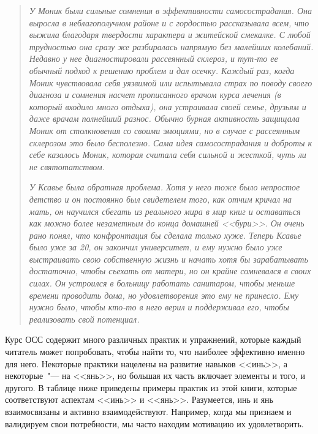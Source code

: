 \begin{quotation}
	\textit{
		У Моник были сильные сомнения в эффективности самосострадания. Она выросла в неблагополучном районе и с гордостью рассказывала всем, что выжила благодаря твердости характера и житейской смекалке. С любой трудностью она сразу же разбиралась напрямую без малейших колебаний. Недавно у нее диагностировали рассеянный склероз, и тут-то ее обычный подход к решению проблем и дал осечку.  Каждый раз, когда Моник чувствовала себя уязвимой или испытывала страх по поводу своего диагноза и сомнения насчет прописанного врачом курса лечения (в который входило много отдыха), она устраивала своей семье, друзьям и даже врачам полнейший разнос. Обычно бурная активность защищала Моник от столкновения со своими эмоциями, но в случае с рассеянным склерозом это было бесполезно. Сама идея самосострадания и доброты к себе казалось Моник, которая считала себя сильной и жесткой, чуть ли не святотатством.
	}  
	
	\textit{
		У Ксавье была обратная проблема. Хотя у него тоже было непростое детство и он постоянно был свидетелем того, как отчим кричал на мать, он научился сбегать из реального мира в мир книг и оставаться как можно более незаметным до конца домашней <<бури>>. Он очень рано понял, что конфронтация бы сделала только хуже. Теперь Ксавье было уже за 20, он закончил университет, и ему нужно было уже выстраивать свою собственную жизнь и начать хотя бы зарабатывать достаточно, чтобы съехать от матери, но он крайне сомневался в своих силах. Он устроился в больницу работать санитаром, чтобы меньше времени проводить дома, но удовлетворения это ему не принесло. Ему нужно было, чтобы кто-то в него верил и поддерживал его, чтобы реализовать свой потенциал.
	} 
\end{quotation}

Курс ОСС содержит много различных практик и упражнений, которые каждый читатель может попробовать, чтобы найти то, что наиболее эффективно именно для него. Некоторые практики нацелены на развитие навыков <<инь>>, а некоторые~"--- на <<янь>>, но большая их часть включает элементы и того, и другого. В таблице ниже приведены примеры практик из этой книги, которые соответствуют аспектам <<инь>> и <<янь>>. Разумеется, инь и янь взаимосвязаны и активно взаимодействуют. Например, когда мы признаем и валидируем свои потребности, мы часто находим мотивацию их удовлетворить.

